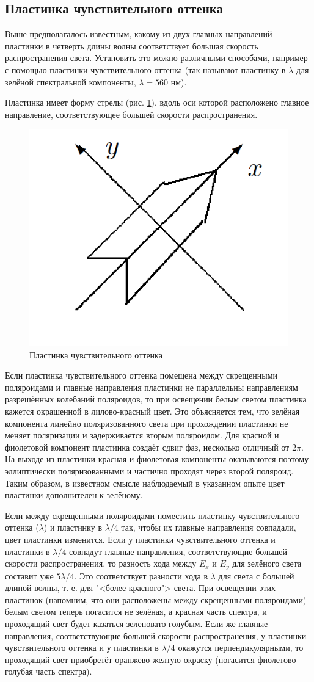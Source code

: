 \documentclass[a4paper,12pt]{article}
\begin{document}
\subsection*{Пластинка чувствительного оттенка}

Выше предполагалось известным, какому из двух главных направлений пластинки в четверть длины волны соответствует большая скорость распространения света.
Установить это можно различными способами, например с помощью
пластинки чувствительного оттенка (так называют пластинку в $ \lambda $
для зелёной спектральной компоненты, $ \lambda = 560 $ нм).

Пластинка имеет форму стрелы (рис. \ref{ris 3}), вдоль оси которой расположено главное направление, соответствующее большей скорости распространения.

\begin{figure}[h] 
	\centering
	\includegraphics[width=0.3\linewidth]{3}
	\caption{Пластинка чувствительного оттенка}
	\label{ris 3}
\end{figure}

Если пластинка чувствительного оттенка помещена между скрещенными поляроидами и главные направления пластинки не параллельны направлениям разрешённых колебаний поляроидов, то при освещении белым светом пластинка кажется окрашенной в лилово-красный цвет.
Это объясняется тем, что зелёная компонента линейно поляризованного света при прохождении пластинки не меняет поляризации и задерживается вторым поляроидом. Для красной и фиолетовой компонент пластинка создаёт сдвиг фаз, несколько отличный от $ 2\pi $. На выходе
из пластинки красная и фиолетовая компоненты оказываются поэтому эллиптически поляризованными и частично проходят через второй поляроид. Таким образом, в известном смысле наблюдаемый в указанном опыте цвет пластинки дополнителен к зелёному.

Если между скрещенными поляроидами поместить пластинку чувствительного оттенка
($ \lambda $) и пластинку в $ \lambda/4 $ так, чтобы их главные направления совпадали, цвет пластинки изменится. Если у пластинки чувствительного оттенка и пластинки в $ \lambda/4  $ совпадут главные направления, соответствующие большей скорости распространения, то разность хода между $ E_x $ и $ E_y $ для зелёного света составит уже $ 5\lambda/4 $. Это соответствует разности хода в $ \lambda $ для света с большей длиной волны, т. е. для "<более красного"> света. При освещении этих пластинок (напомним, что они расположены между скрещенными поляроидами) белым светом теперь погасится не зелёная, а красная часть спектра, и проходящий свет будет казаться зеленовато-голубым. Если же главные направления, соответствующие большей скорости распространения, у пластинки чувствительного оттенка и у пластинки в $ \lambda/4 $ окажутся перпендикулярными, то проходящий свет приобретёт
оранжево-желтую окраску (погасится фиолетово-голубая часть спектра).
\end{document}
